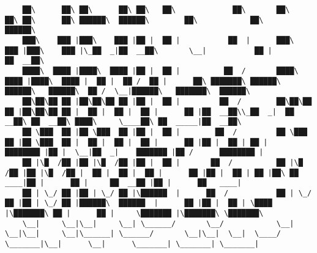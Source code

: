 \documentclass[varwidth=\maxdimen,margin=0.5cm,multi={verbatim}]{standalone}
\begin{document}
\begin{verbatim}
    ██\      ██\ ██\      ██\ ██\   ██\             ██\       ██\      ██\ ██\      ██\ ██████\  ██████\        ██\            ██\                          ██████\                               
    ███\    ███ |███\    ███ |██ |  ██ |           ██  |      ███\    ███ |███\    ███ |\_██  _|██  __██\       \__|           ██ |                        ██  __██\                              
    ████\  ████ |████\  ████ |██ |  ██ |          ██  /       ████\  ████ |████\  ████ |  ██ |  ██ /  ██ |      ██\ ███████\ ██████\    ██████\   ██████\  ██ /  \__|██████\   ███████\  ██████\  
    ██\██\██ ██ |██\██\██ ██ |██ |  ██ |         ██  /        ██\██\██ ██ |██\██\██ ██ |  ██ |  ██ |  ██ |      ██ |██  __██\\_██  _|  ██  __██\ ██  __██\ ████\     \____██\ ██  _____|██  __██\ 
    ██ \███  ██ |██ \███  ██ |██ |  ██ |        ██  /         ██ \███  ██ |██ \███  ██ |  ██ |  ██ |  ██ |      ██ |██ |  ██ | ██ |    ████████ |██ |  \__|██  _|    ███████ |██ /      ████████ |
    ██ |\█  /██ |██ |\█  /██ |██ |  ██ |       ██  /          ██ |\█  /██ |██ |\█  /██ |  ██ |  ██ |  ██ |      ██ |██ |  ██ | ██ |██\ ██   ____|██ |      ██ |     ██  __██ |██ |      ██   ____|
    ██ | \_/ ██ |██ | \_/ ██ |\██████  |      ██  /           ██ | \_/ ██ |██ | \_/ ██ |██████\  ██████  |      ██ |██ |  ██ | \████  |\███████\ ██ |      ██ |     \███████ |\███████\ \███████\ 
    \__|     \__|\__|     \__| \______/       \__/            \__|     \__|\__|     \__|\______| \______/       \__|\__|  \__|  \____/  \_______|\__|      \__|      \_______| \_______| \_______|




\end{verbatim}
\end{document}
